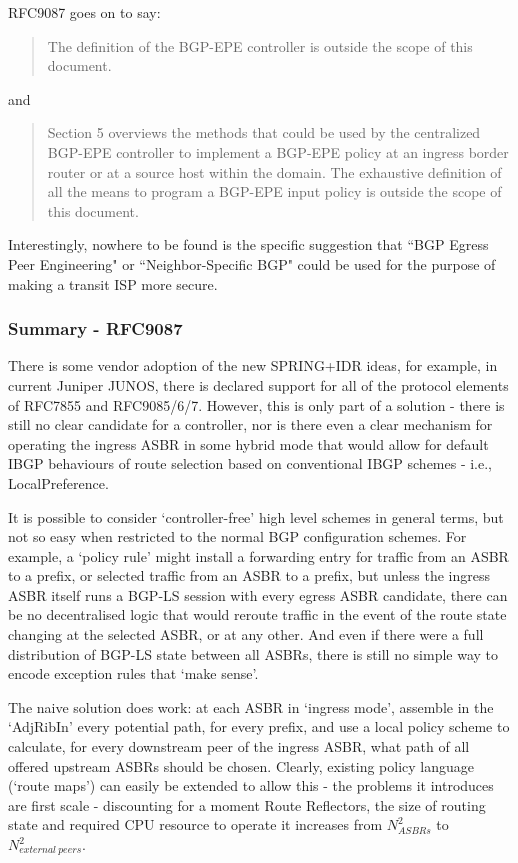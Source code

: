 RFC9087 goes on to say:
\begin{quote}
      The definition of the BGP-EPE controller is outside the scope of this document.

\end{quote}

and 
   \begin{quote}
     Section 5 overviews the methods that could be used by the centralized BGP-EPE controller to implement a BGP-EPE policy at an ingress border router or at a source host within the domain.  The exhaustive definition of all the means to program a BGP-EPE input policy is outside the scope of this document.
\end{quote}

Interestingly, nowhere to be found is the specific suggestion that ``BGP Egress Peer Engineering" or ``Neighbor-Speciﬁc BGP" could be used for the purpose of making a transit ISP more secure.

\subsubsection{Summary - RFC9087}
There is some vendor adoption of the new SPRING+IDR ideas, for example, in current Juniper JUNOS, there is declared support for all of the protocol elements of RFC7855 and  RFC9085/6/7.   However, this is only part of a solution - there is still no clear candidate for a controller, nor is there even a clear mechanism for operating the ingress ASBR in some hybrid mode that would allow for default IBGP behaviours of route selection based on conventional IBGP schemes - i.e., LocalPreference.

It is possible to consider `controller-free' high level schemes in general terms, but not so easy when restricted to the normal BGP configuration schemes. For example, a `policy rule' might install a forwarding entry for traffic from an ASBR to a prefix, or selected traffic from an ASBR to a prefix, but unless the ingress ASBR itself runs a BGP-LS session with every egress ASBR candidate, there can be no decentralised logic that would reroute traffic in the event of the route state changing at the selected ASBR, or at any other.  And even if there were a full distribution of BGP-LS state between all ASBRs, there is still no simple way to encode exception rules that `make sense'.  

The naive solution does work:
at each ASBR in `ingress mode', assemble in the `AdjRibIn' every potential path, for every prefix, and use a local policy scheme to calculate, for every downstream peer of the ingress ASBR, what path of all offered upstream ASBRs should be chosen.  Clearly, existing policy language (`route maps') can easily be extended to allow this - the problems it introduces are first scale - discounting for a moment Route Reflectors, the size of routing state and required CPU resource to operate it increases from $ N_{ASBRs}^2 $ to $ N_{external\ peers}^2 $.

